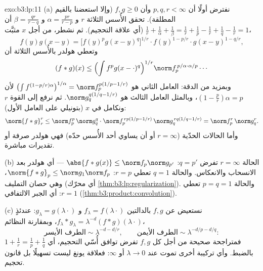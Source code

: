 \begin{solution}{exo:b3:lp:11}
(a) نفترض أولًا أن $p, q, r < \infty$ وأن $f, g \geq 0$ (وإلا استعضنا
بالقيم المطلقة). تحقق الأُسس الثلاثة $r$ و $\alpha = \frac{pr}{r-p}$ و $\beta = \frac{qr}{r-q}$ أن
$\frac1r + \frac1\alpha + \frac1\beta = \frac1r +
\frac1p - \frac1r + \frac1q - \frac1r = 1$ (أي علاقة التحجيم). ثم نشطر، من أجل $x$ مثبَّت،
\[
f(y)g(x-y) = \bigl[f(y)^pg(x-y)^q\bigr]^{1/r}\cdot
f(y)^{1 - p/r}\cdot g(x-y)^{1 - q/r},
\]
وتعطي هولدر بالأُسس الثلاثة أن
\[
(f*g)(x) \leq \Bigl(\int f^pg(x-\cdot)^q\Bigr)^{1/r}
\norm f_p^{\,p/\alpha\cdot\alpha/p}\cdots
\]
وبمزيد من الدقة: العامل الثاني هو $\bigl(\int f^{(1-p/r)\alpha}\bigr)^{1/\alpha} =
\norm f_p^{p(1/p - 1/r)}$ لأن $(1 - \frac pr)\alpha = p$،
وبالمثل العامل الثالث هو $\norm g_q^{q(1/q - 1/r)}$. ثم نرفع إلى القوة $r$ ونكامل
في $x$ (بتونيلي على العامل الأول):
\[
\norm{f*g}_r^r \leq \norm f_p^p\,\norm g_q^q\cdot
\norm f_p^{\,rp(1/p - 1/r)}\,\norm g_q^{\,rq(1/q - 1/r)}
= \norm f_p^r\,\norm g_q^r .
\]
وأما الحالات الحدّية ($r = \infty$ أو أن يساوي أحد الأُسس حدّه)
فهي هولدر صرفة أو تقديرات مباشرة.

(b) الحالة $r = \infty$ تفرض $q = p'$: $\abs{f*g(x)} \leq \norm
f_p\norm g_{p'}$ --- أي هولدر بعد
الانسحاب والانعكاس. والحالة $q = 1$ تعطي $r = p$: $\norm{f*g}_p \leq \norm
g_1\norm f_p$، وهي
حصان التمليف (أي محرّك \cref{thm:b3:lp:regularization}). والحالة $p = q = 1$ تعطي
$r = 1$: أي الجبر الالتفافي (\cref{thm:b3:product:convolution}).

(c) نستعيض عن $f, g$ بالدالتين $f_\lambda = f(\lambda\cdot)$ و $g_\lambda = g(\lambda\cdot)$: عندئذٍ
$f_\lambda*g_\lambda =
\lambda^{-d}(f*g)(\lambda\cdot)$، وبمقارنة النظائم،
\[
\text{الطرف الأيسر} \sim \lambda^{-d - d/r}, \qquad
\text{الطرف الأيمن} \sim \lambda^{-d/p - d/q} :
\]
فمتراجحة صحيحة من أجل كل $f, g$ تفرض توافق أُسّي التحجيم، أي
$1 + \frac1r = \frac1p + \frac1q$ بالضبط. وأي تركيبة أخرى تموت عند $\lambda \to 0$ أو
$\infty$: فعلاقة يونغ ليست تسهيلًا بل قانون تحجيم.
\end{solution}

